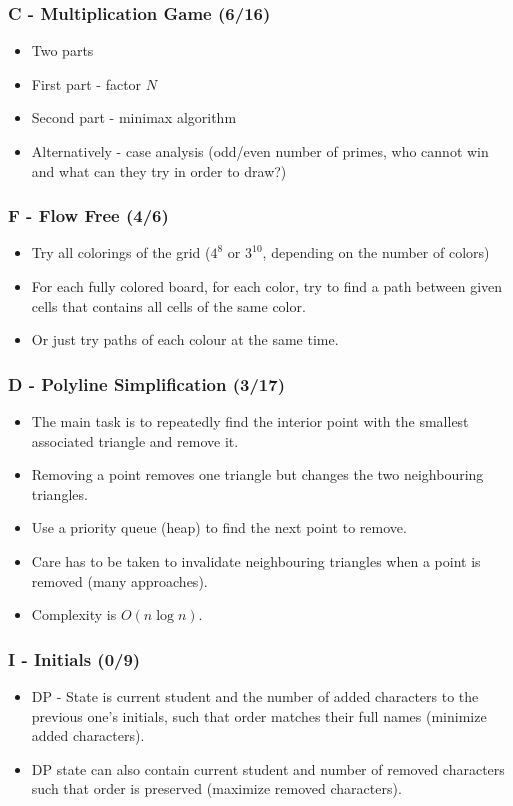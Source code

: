 \documentclass{beamer}
\begin{document}
\begin{frame}
\frametitle{C - Multiplication Game (6/16)}
\begin{itemize}
\setlength\itemsep{0.5\baselineskip}
\item Two parts
\item First part - factor $N$
\item Second part - minimax algorithm
\item Alternatively - case analysis (odd/even number of primes, who cannot win and what can they try in order to draw?)
\end{itemize}
\end{frame}


\begin{frame}
\frametitle{F - Flow Free (4/6)}
\begin{itemize}
\setlength\itemsep{0.5\baselineskip}
\item Try all colorings of the grid ($4^8$ or $3^{10}$, depending on the number of colors)
\item For each fully colored board, for each color, try to find a path between given cells that contains all cells of the same color.
\item Or just try paths of each colour at the same time.
\end{itemize}
\end{frame}


\begin{frame}
\frametitle{D - Polyline Simplification (3/17)}
\begin{itemize}
\setlength\itemsep{0.5\baselineskip}
\item The main task is to repeatedly find the interior point with the smallest
  associated triangle and remove it.
\item Removing a point removes one triangle but changes the two neighbouring
  triangles.
\item Use a priority queue (heap) to find the next point to remove.
\item Care has to be taken to invalidate neighbouring triangles when a
  point is removed (many approaches).
\item Complexity is $O(n \log n)$.
\end{itemize}
\end{frame}


\begin{frame}
\frametitle{I - Initials (0/9)}
\begin{itemize}
\setlength\itemsep{0.5\baselineskip}
\item DP - State is current student and the number of added characters to the previous one's initials, such that order matches their full names (minimize added characters).
\item DP state can also contain current student and number of removed characters such that order is preserved (maximize removed characters).
\end{itemize}
\end{frame}
\end{document}
